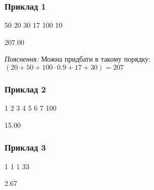 \documentclass[12pt,a4paper]{article}
\begin{document}
\subsubsection*{Приклад 1}

\textbf{}

\begin{codeblock}
50 20 30 17 100
10
\end{codeblock}

\textbf{}

\begin{codeblock}
207.00
\end{codeblock}
\emph{Пояснення:} Можна придбати в такому порядку: \((20 + 50 + 100\cdot0.9 + 17 + 30) = 207\)


\subsubsection*{Приклад 2}

\textbf{}

\begin{codeblock}
1 2 3 4 5 6 7
100
\end{codeblock}

\textbf{}

\begin{codeblock}
15.00
\end{codeblock}


\subsubsection*{Приклад 3}

\textbf{}

\begin{codeblock}
1 1 1
33
\end{codeblock}

\textbf{}

\begin{codeblock}
2.67
\end{codeblock}
\end{document}

